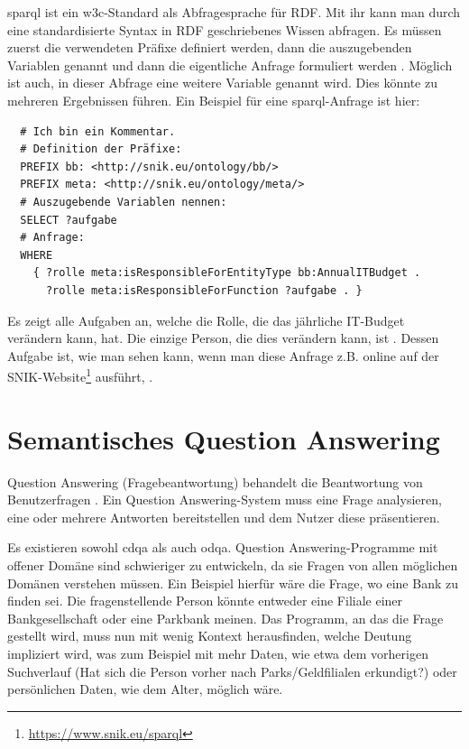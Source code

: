 \ac{sparql} ist ein \ac{w3c}-Standard als Abfragesprache für RDF.
Mit ihr kann man durch eine standardisierte Syntax in RDF geschriebenes Wissen abfragen.
Es müssen zuerst die verwendeten Präfixe definiert werden, dann die auszugebenden Variablen genannt und dann die eigentliche Anfrage formuliert werden \citep[S.~203]{semanticwebgrundlagen}.
Möglich ist auch, in dieser Abfrage eine weitere Variable genannt wird.
Dies könnte zu mehreren Ergebnissen führen.
Ein Beispiel für eine \ac{sparql}-Anfrage ist hier:
\begin{lstlisting}
  # Ich bin ein Kommentar.
  # Definition der Präfixe:
  PREFIX bb: <http://snik.eu/ontology/bb/>
  PREFIX meta: <http://snik.eu/ontology/meta/>
  # Auszugebende Variablen nennen:
  SELECT ?aufgabe
  # Anfrage:
  WHERE
    { ?rolle meta:isResponsibleForEntityType bb:AnnualITBudget .
      ?rolle meta:isResponsibleForFunction ?aufgabe . }
\end{lstlisting}
Es zeigt alle Aufgaben an, welche die Rolle, die das jährliche IT-Budget verändern kann, hat.
Die einzige Person, die dies verändern kann, ist .
Dessen Aufgabe ist, wie man sehen kann, wenn man diese Anfrage z.B. online auf der SNIK-Website\footnote{\url{https://www.snik.eu/sparql}} ausführt, .

\section{Semantisches Question Answering}

\begin{definition}
Question Answering (Fragebeantwortung) behandelt die Beantwortung von Benutzerfragen \citep{qadefinition}.
Ein Question Answering-System muss eine Frage analysieren, eine oder mehrere Antworten bereitstellen und dem Nutzer diese präsentieren.
\end{definition}

Es existieren sowohl \ac{cdqa} als auch \ac{odqa}.
Question Answering-Programme mit offener Domäne sind schwieriger zu entwickeln,
da sie Fragen von allen möglichen Domänen verstehen müssen.
Ein Beispiel hierfür wäre die Frage, wo eine Bank zu finden sei.
Die fragenstellende Person könnte entweder eine Filiale einer Bankgesellschaft oder eine Parkbank meinen.
Das Programm, an das die Frage gestellt wird, muss nun mit wenig Kontext herausfinden,
welche Deutung impliziert wird, was zum Beispiel mit mehr Daten,
wie etwa dem vorherigen Suchverlauf (Hat sich die Person vorher nach Parks/Geldfilialen erkundigt?)
oder persönlichen Daten, wie dem Alter, möglich wäre.

